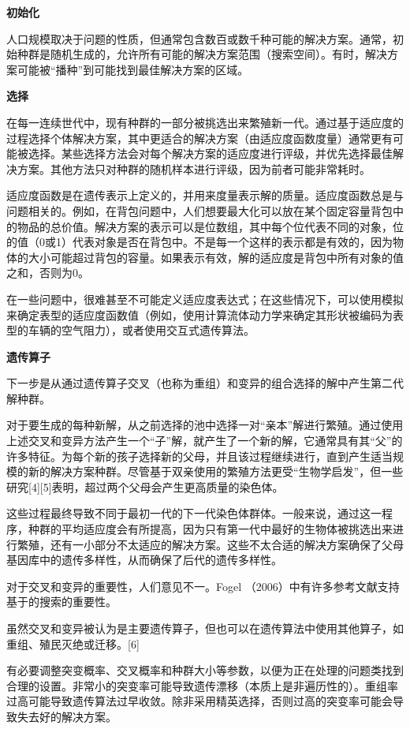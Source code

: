\textbf{初始化}

人口规模取决于问题的性质，但通常包含数百或数千种可能的解决方案。通常，初始种群是随机生成的，允许所有可能的解决方案范围（搜索空间）。有时，解决方案可能被“播种”到可能找到最佳解决方案的区域。

\textbf{选择}

在每一连续世代中，现有种群的一部分被挑选出来繁殖新一代。通过基于适应度的过程选择个体解决方案，其中更适合的解决方案（由适应度函数度量）通常更有可能被选择。某些选择方法会对每个解决方案的适应度进行评级，并优先选择最佳解决方案。其他方法只对种群的随机样本进行评级，因为前者可能非常耗时。

适应度函数是在遗传表示上定义的，并用来度量表示解的质量。适应度函数总是与问题相关的。例如，在背包问题中，人们想要最大化可以放在某个固定容量背包中的物品的总价值。解决方案的表示可以是位数组，其中每个位代表不同的对象，位的值（0或1）代表对象是否在背包中。不是每一个这样的表示都是有效的，因为物体的大小可能超过背包的容量。如果表示有效，解的适应度是背包中所有对象的值之和，否则为0。

在一些问题中，很难甚至不可能定义适应度表达式；在这些情况下，可以使用模拟来确定表型的适应度函数值（例如，使用计算流体动力学来确定其形状被编码为表型的车辆的空气阻力），或者使用交互式遗传算法。

\textbf{遗传算子}

下一步是从通过遗传算子交叉（也称为重组）和变异的组合选择的解中产生第二代解种群。

对于要生成的每种新解，从之前选择的池中选择一对“亲本”解进行繁殖。通过使用上述交叉和变异方法产生一个“子”解，就产生了一个新的解，它通常具有其“父”的许多特征。为每个新的孩子选择新的父母，并且该过程继续进行，直到产生适当规模的新的解决方案种群。尽管基于双亲使用的繁殖方法更受“生物学启发”，但一些研究[4][5]表明，超过两个父母会产生更高质量的染色体。

这些过程最终导致不同于最初一代的下一代染色体群体。一般来说，通过这一程序，种群的平均适应度会有所提高，因为只有第一代中最好的生物体被挑选出来进行繁殖，还有一小部分不太适应的解决方案。这些不太合适的解决方案确保了父母基因库中的遗传多样性，从而确保了后代的遗传多样性。

对于交叉和变异的重要性，人们意见不一。Fogel （2006）中有许多参考文献支持基于的搜索的重要性。

虽然交叉和变异被认为是主要遗传算子，但也可以在遗传算法中使用其他算子，如重组、殖民灭绝或迁移。[6]

有必要调整突变概率、交叉概率和种群大小等参数，以便为正在处理的问题类找到合理的设置。非常小的突变率可能导致遗传漂移（本质上是非遍历性的）。重组率过高可能导致遗传算法过早收敛。除非采用精英选择，否则过高的突变率可能会导致失去好的解决方案。

